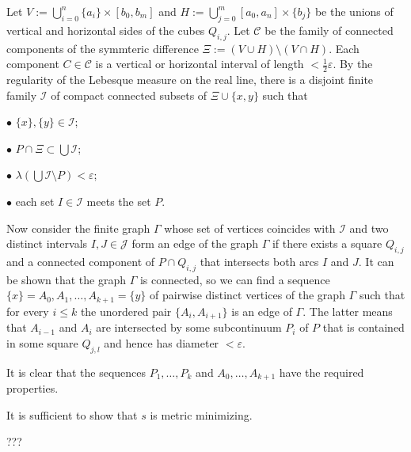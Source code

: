 Let $V:=\bigcup_{i=0}^n\{a_i\}\times [b_0,b_m]$ and $H:=\bigcup_{j=0}^m[a_0,a_n]\times\{b_j\}$ be the unions of vertical and horizontal sides of the cubes $Q_{i,j}$. Let $\mathcal C$ be the family of connected components of the symmteric difference $\Xi:=(V\cup H)\setminus (V\cap H)$. Each component $C\in\mathcal C$ is a vertical or horizontal interval of length $<\frac12\varepsilon$. By the regularity of the Lebesque measure on the real line, there is a disjoint finite family $\mathcal I$ of compact connected subsets of $\Xi\cup\{x,y\}$ such that

$\bullet$ $\{x\},\{y\}\in\mathcal I$;

$\bullet$ $P\cap\Xi\subset \bigcup\mathcal I$;

$\bullet$ $\lambda(\bigcup\mathcal I\setminus P)<\varepsilon$;

$\bullet$ each set $I\in\mathcal I$ meets the set $P$.

Now consider the finite graph $\Gamma$ whose set of vertices coincides with $\mathcal I$ and two distinct intervals $I,J\in\mathcal J$ form an edge of the graph $\Gamma$ if there exists a square $Q_{i,j}$ and a connected component of $P\cap Q_{i,j}$ that intersects both arcs $I$ and $J$. It can be shown that the graph $\Gamma$ is connected, so we can find a sequence $\{x\}=A_0,A_1,\dots,A_{k+1}=\{y\}$ of pairwise distinct vertices of the graph $\Gamma$ such that for every $i\le k$ the unordered pair $\{A_i,A_{i+1}\}$ is an edge of $\Gamma$. The latter means that $A_{i-1}$ and $A_i$ are intersected by some subcontinuum $P_i$ of $P$ that is contained in some square $Q_{j,l}$ and hence has diameter $<\varepsilon$.

It is clear that the sequences $P_1,\dots,P_k$ and $A_0,\dots,A_{k+1}$ have the required properties.
\qeds

It is sufficient to show that $s$ is metric minimizing.

???
\qeds
